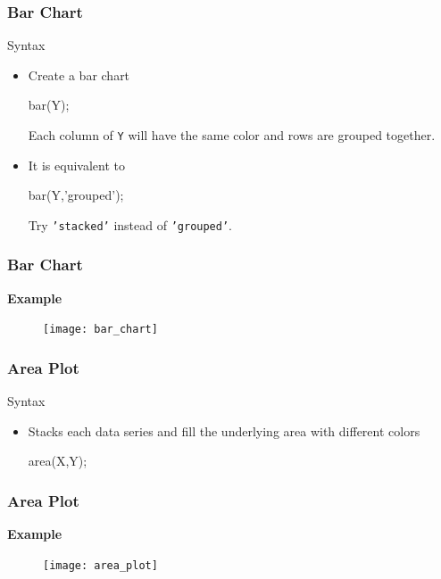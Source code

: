 \documentclass{beamer}  %
\begin{document}
\begin{frame}[fragile]
\frametitle{Bar Chart}

\begin{block}{Syntax}
\begin{itemize}[<+->]
    \item Create a bar chart
          \begin{matlabcodebeamer}[numbers=none,frame=none]
          bar(Y);
          \end{matlabcodebeamer}
          Each column of \texttt{Y} will have the same color and rows are grouped together.
    \item It is equivalent to
          \begin{matlabcodebeamer}[numbers=none,frame=none]
          bar(Y,'grouped');
          \end{matlabcodebeamer}
          Try \texttt{'stacked'} instead of \texttt{'grouped'}.
\end{itemize}
\end{block}

\end{frame}
\begin{frame}[fragile]
\frametitle{Bar Chart}
\textbf{Example} 

\setcounter{subfigure}{0}
\begin{figure}
    \centering
   \texttt{[image: bar\_chart]}
\end{figure}

\end{frame}
\begin{frame}[fragile]
\frametitle{Area Plot}

\begin{block}{Syntax}
\begin{itemize}
    \item Stacks each data series and fill the underlying area with different colors
          \begin{matlabcodebeamer}[numbers=none,frame=none]
          area(X,Y);
          \end{matlabcodebeamer}
\end{itemize}
\end{block}

\end{frame}
\begin{frame}[fragile]
\frametitle{Area Plot}
\textbf{Example} 

\setcounter{subfigure}{0}
\begin{figure}
    \centering
   \texttt{[image: area\_plot]}
\end{figure}

\end{frame}
\end{document}
